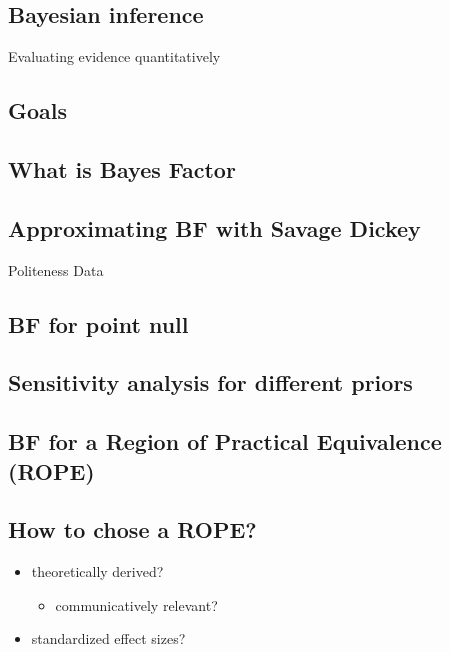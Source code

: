 \documentclass[
  jou,
  longtable,
  nolmodern,
  notxfonts,
  notimes,
  colorlinks=true,linkcolor=blue,citecolor=blue,urlcolor=blue]{apa7}
\providecommand{\tightlist}{%
  \setlength{\itemsep}{0pt}\setlength{\parskip}{0pt}}
\begin{document}
\subsection{Bayesian inference}\label{bayesian-inference}

Evaluating evidence quantitatively

\subsection{Goals}\label{goals}

\subsection{What is Bayes Factor}\label{what-is-bayes-factor}

\subsection{Approximating BF with Savage
Dickey}\label{approximating-bf-with-savage-dickey}

Politeness Data

\subsection{BF for point null}\label{bf-for-point-null}

\subsection{Sensitivity analysis for different
priors}\label{sensitivity-analysis-for-different-priors}

\subsection{BF for a Region of Practical Equivalence
(ROPE)}\label{bf-for-a-region-of-practical-equivalence-rope}

\subsection{How to chose a ROPE?}\label{how-to-chose-a-rope}

\begin{itemize}
\tightlist
\item
  theoretically derived?

  \begin{itemize}
  \tightlist
  \item
    communicatively relevant?
  \end{itemize}
\item
  standardized effect sizes?
\end{itemize}
\end{document}
